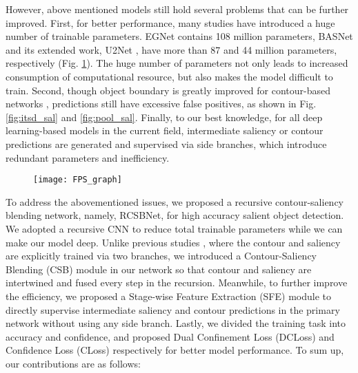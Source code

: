 \documentclass[10pt,twocolumn,letterpaper]{article}
\begin{document}
However, above mentioned models still hold several problems that can be further improved. First, for better performance, many studies have introduced a huge number of trainable parameters. EGNet contains 108 million parameters, BASNet and its extended work, U2Net \cite{U2NET}, have more than 87 and 44 million parameters, respectively (Fig. \ref{fig:FPS}). The huge number of parameters not only leads to increased consumption of computational resource, but also makes the model difficult to train. Second, though object boundary is greatly improved for contour-based networks  \cite{POOLNET}\cite{EGNET}\cite{ITSD}, predictions still have excessive false positives, as shown in Fig. \ref{fig:itsd_sal} and \ref{fig:pool_sal}. Finally, to our best knowledge, for all deep learning-based models in the current field, intermediate saliency or contour predictions are generated and supervised via side branches, which introduce redundant parameters and inefficiency.

\begin{figure}
  \centering
  \texttt{[image: FPS\_graph]}
  \label{fig:FPS}
\end{figure}

To address the abovementioned issues, we proposed a recursive contour-saliency blending network, namely, RCSBNet, for high accuracy salient object detection. We adopted a recursive CNN to reduce total trainable parameters while we can make our model deep. Unlike previous studies \cite{POOLNET}\cite{EGNET}\cite{ITSD}, where the contour and saliency are explicitly trained via two branches, we introduced a Contour-Saliency Blending (CSB) module in our network so that contour and saliency are intertwined and fused every step in the recursion. Meanwhile, to further improve the efficiency, we proposed a Stage-wise Feature Extraction (SFE) module to directly supervise intermediate saliency and contour predictions in the primary network without using any side branch. Lastly, we divided the training task into accuracy and confidence, and proposed Dual Confinement Loss (DCLoss) and Confidence Loss (CLoss) respectively for better model performance. To sum up, our contributions are as follows:
\end{document}
